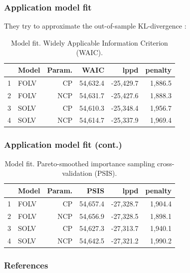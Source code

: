 \documentclass[arial,12pt,xcolor=dvipsnames]{beamer}
\begin{document}
%
\begin{frame}
	\frametitle{Application model fit}
	They try to approximate the out-of-sample KL-divergence \cite{Kullback_et_al_1951}:
	\begin{table}[H]
		\centering
		\begin{tabular}{rlrrrr}
			\hline
			& Model & Param. & WAIC & lppd & penalty \\  
			\hline\hline
			1 & FOLV & CP &  54,632.4 & -25,429.7 & 1,886.5 \\ 
			2 & FOLV & NCP & 54,631.7 & -25,427.6 & 1,888.3 \\
			\hline
			3 & SOLV & CP &  54,610.3 & -25,348.4 & 1,956.7 \\  
			4 & SOLV & NCP & 54,614.7 & -25,337.9 & 1,969.4 \\ 
			\hline
		\end{tabular}
		\caption[Model fit. Widely Applicable Information Criterion (WAIC).]%
		{Model fit. Widely Applicable Information Criterion (WAIC).}
		\label{tab:model_fit1}
	\end{table}
\end{frame}
%
\begin{frame}
	\frametitle{Application model fit (cont.)}
	\begin{table}[H]
		\centering
		\begin{tabular}{rlrrrr}
			\hline
			& Model & Param. & PSIS & lppd & penalty \\  
			\hline\hline
			1 & FOLV & CP &  54,657.4 & -27,328.7 & 1,904.4 \\ 
			2 & FOLV & NCP & 54,656.9 & -27,328.5 & 1,898.1  \\
			\hline
			3 & SOLV & CP &  54,627.3 & -27,313.7 & 1,940.1 \\  
			4 & SOLV & NCP & 54,642.5 & -27,321.2 & 1,990.2 \\ 
			\hline
		\end{tabular}
		\caption[Model fit. Pareto-smoothed importance sampling cross-validation (PSIS).]%
		{Model fit. Pareto-smoothed importance sampling cross-validation (PSIS).}
		\label{tab:model_fit2}
	\end{table} 
\end{frame}
%
%
%
\begin{frame}[allowframebreaks]
\frametitle{References}
%


%
\end{frame}
%
%
\end{document}
